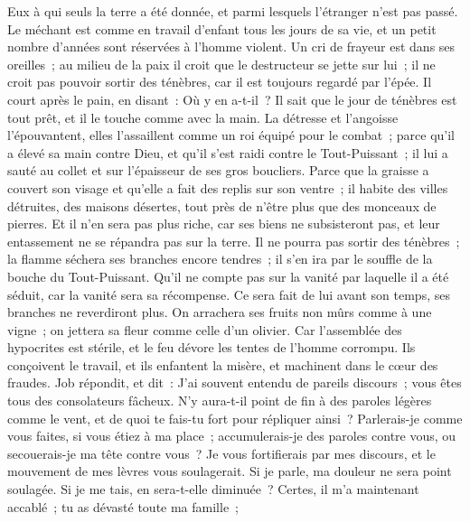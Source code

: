 \begin{multicols}{2}
Eux à qui seuls la terre a été donnée, et parmi lesquels l'étranger n'est pas passé.
Le méchant est comme en travail d'enfant tous les jours de sa vie, et un petit nombre d'années sont réservées à l'homme violent.
Un cri de frayeur est dans ses oreilles~; au milieu de la paix il croit que le destructeur se jette sur lui~;
il ne croit pas pouvoir sortir des ténèbres, car il est toujours regardé par l'épée.
Il court après le pain, en disant~: Où y en a-t-il~? Il sait que le jour de ténèbres est tout prêt, et il le touche comme avec la main.
La détresse et l'angoisse l'épouvantent, elles l'assaillent comme un roi équipé pour le combat~;
parce qu'il a élevé sa main contre Dieu, et qu'il s'est raidi contre le Tout-Puissant~;
il lui a sauté au collet et sur l'épaisseur de ses gros boucliers. 
Parce que la graisse a couvert son visage et qu'elle a fait des replis sur son ventre~;
 il habite des villes détruites, des maisons désertes, tout près de n'être plus que des monceaux de pierres. 
Et il n'en sera pas plus riche, car ses biens ne subsisteront pas, et leur entassement ne se répandra pas sur la terre.
Il ne pourra pas sortir des ténèbres~; la flamme séchera ses branches encore tendres~; il s'en ira par le souffle de la bouche du Tout-Puissant.
Qu'il ne compte pas sur la vanité par laquelle il a été séduit, car la vanité sera sa récompense.
Ce sera fait de lui avant son temps, ses branches ne reverdiront plus. 
On arrachera ses fruits non mûrs comme à une vigne~; on jettera sa fleur comme celle d'un olivier. 
Car l'assemblée des hypocrites est stérile, et le feu dévore les tentes de l'homme corrompu.
Ils conçoivent le travail, et ils enfantent la misère, et machinent dans le cœur des fraudes.
\VerseOne{}Job répondit, et dit~:
J'ai souvent entendu de pareils discours~; vous êtes tous des consolateurs fâcheux.
N'y aura-t-il point de fin à des paroles légères comme le vent, et de quoi te fais-tu fort pour répliquer ainsi~?
Parlerais-je comme vous faites, si vous étiez à ma place~; accumulerais-je des paroles contre vous, ou secouerais-je ma tête contre vous~? 
Je vous fortifierais par mes discours, et le mouvement de mes lèvres vous soulagerait.
Si je parle, ma douleur ne sera point soulagée. Si je me tais, en sera-t-elle diminuée~?
Certes, il m'a maintenant accablé~; tu as dévasté toute ma famille~; 

\end{multicols}
